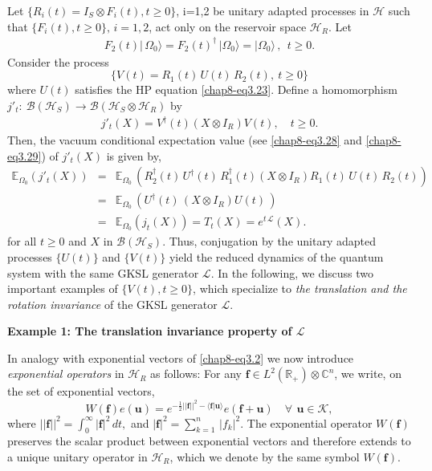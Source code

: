 Let $\{R_i(t)=I_S\otimes F_i(t), t\geq 0\}$, i=1,2  be unitary adapted processes in $\mathcal{H}$ such that  $\{F_i(t), t\geq 0\},\, i=1,2$, act only on the reservoir space $\mathcal{H}_R$. Let 
\begin{eqnarray}
F_2(t)\vert\, \Omega_0\rangle=F_2(t)^\dag\,\vert \Omega_0\rangle=\vert\Omega_0\rangle\, ,\ \ t\geq 0. \label{chap8-eq4.1}
\end{eqnarray}
Consider the process 
\begin{equation}
\{V(t)=R_1(t)\, U(t)\, R_2(t),\  t\geq 0\} \label{chap8-eq4.2}
\end{equation} 
where  $U(t)$ satisfies the HP equation \eqref{chap8-eq3.23}. Define a homomorphism $j'_t:  \ \mathcal{B}(\mathcal{H}_S)\longrightarrow \mathcal{B}(\mathcal{H}_S\otimes\mathcal{H}_R)$ by 
\begin{eqnarray}
j'_t (X) = V^{\dagger}(t) (X \otimes I_R)  V(t), \quad t \ge 0.   \label{chap8-eq4.3}
\end{eqnarray}
Then, the vacuum conditional expectation value (see \eqref{chap8-eq3.28} and \eqref{chap8-eq3.29}) of $j'_{t}(X)$ is given by, 
\begin{eqnarray}
\mathbb{E}_{\Omega_0} \left(j'_t(X)\right) &=& \mathbb{E}_{\Omega_0}\, \left(R^{\dagger}_2(t)\, U^\dag(t)\, R^\dag_1(t) (X \otimes I_R)  R_1(t)\, U(t)\, R_2(t)\right)\nonumber \\
&=& \mathbb{E}_{\Omega_0}\,\left( U^\dag(t)\,  (X \otimes I_R)  U(t)\, \right)\nonumber\\
&=&\mathbb{E}_{\Omega_0} \left(j_t(X)\right)=T_t(X) =e^{t\,\mathcal{L}}(X).   \label{chap8-eq4.4}
\end{eqnarray} 
for all $t\geq 0$ and $X$ in $\mathcal{B}(\mathcal{H}_S)$. Thus, conjugation by the unitary adapted processes $\{U(t)\}$ and $\{V(t)\}$ yield the reduced dynamics of the quantum system with  the same GKSL generator $\mathcal{L}$. 
In the following, we discuss two important examples of $\{V(t), t\geq 0\}$, which specialize to {\em the  translation  and the rotation invariance} of the GKSL generator $\mathcal{L}$. 
\eject

\noindent \textbf{\large{Example 1:  The translation invariance property of $\mathcal{L}$}} 
\bigskip

In analogy with exponential vectors of \eqref{chap8-eq3.2} we now introduce {\it exponential operators}  in $\mathcal{H}_R$ as follows:  For any $\mathbf{f}\in L^2(\mathbb{R}_+)\otimes \mathbb{C}^n$, we write, on the set of exponential vectors, 
\begin{equation}
W(\mathbf{f}) e(\mathbf{u}) = e^{-\frac{1}{2} ||\mathbf{f}||^{2} - \langle \mathbf{f}|\mathbf{u} \rangle} e (\mathbf{f}+\mathbf{u}) \quad \forall\, \ \mathbf{u}\in\mathcal{K},      \label{chap8-eq4.5}
\end{equation} 
where $\vert\vert\mathbf{f}\vert\vert^{2}=\int_0^{\infty} \vert \mathbf{f}\vert^2\, dt,$ and $\vert \mathbf{f}\vert^2= \sum_{k=1}^{n}\,\vert  f_k\vert^2$.  The exponential operator $W(\mathbf{f})$ preserves the scalar product between exponential vectors and therefore extends to a unique unitary operator in $\mathcal{H}_R$, which we denote by the same symbol $W(\mathbf{f})$. 

